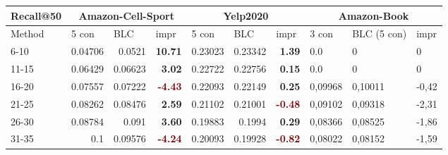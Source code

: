 \begin{table*}[]%
    \centering
    \begin{tabular}{|l|r|r|r||r|r|r||l|l|l|}
        \hline
        Recall@50 & \multicolumn{3}{c||}{Amazon-Cell-Sport} & \multicolumn{3}{c|}{Yelp2020} & \multicolumn{3}{c|}{Amazon-Book}                                                                                                                                       \\ \hline
        Method    & \multicolumn{1}{l|}{5 con}              & \multicolumn{1}{l|}{BLC}      & \multicolumn{1}{l||}{impr}             & \multicolumn{1}{l|}{5 con} & \multicolumn{1}{l|}{BLC} & \multicolumn{1}{l||}{impr}            & 3 con   & BLC (5 con) & impr  \\ \hline
        6-10      & 0.04706                                 & 0.0521                        & \textbf{\textcolor{OliveGreen}{10.71}} & 0.23023                    & 0.23342                  & \textbf{\textcolor{OliveGreen}{1.39}} & 0.0     & 0           & 0     \\ \hline
        11-15     & 0.06429                                 & 0.06623                       & \textbf{\textcolor{OliveGreen}{3.02}}  & 0.22722                    & 0.22756                  & \textbf{\textcolor{OliveGreen}{0.15}} & 0.0     & 0           & 0     \\ \hline
        16-20     & 0.07557                                 & 0.07222                       & \textbf{\textcolor{Maroon}{-4.43}}     & 0.22093                    & 0.22149                  & \textbf{\textcolor{OliveGreen}{0.25}} & 0,09968 & 0,10011     & -0,42 \\ \hline
        21-25     & 0.08262                                 & 0.08476                       & \textbf{\textcolor{OliveGreen}{2.59}}  & 0.21102                    & 0.21001                  & \textbf{\textcolor{Maroon}{-0.48}}    & 0,09102 & 0,09318     & -2,31 \\ \hline
        26-30     & 0.08784                                 & 0.091                         & \textbf{\textcolor{OliveGreen}{3.60}}  & 0.19883                    & 0.1994                   & \textbf{\textcolor{OliveGreen}{0.29}} & 0,08366 & 0,08525     & -1,86 \\ \hline
        31-35     & 0.1                                     & 0.09576                       & \textbf{\textcolor{Maroon}{-4.24}}     & 0.20093                    & 0.19928                  & \textbf{\textcolor{Maroon}{-0.82}}    & 0,08022 & 0,08152     & -1,59 \\ \hline

\end{tabular}
\end{table*}
